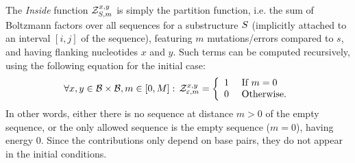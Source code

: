 The \emph{Inside} function $\mathcal{Z}_{S, m}^{x,y}$ is simply the partition function, i.e. the sum of Boltzmann factors over all sequences for a substructure $S$ (implicitly attached to an interval $[i,j]$ of the sequence), featuring $m$ mutations/errors compared to $s$, and having flanking nucleotides $x$ and $y$. 
Such terms can be computed recursively, using the following equation for the initial case:
\begin{equation}
	\forall x,y\in \mathcal{B}\times \mathcal{B}, m\in [0,M]:\, \mathcal{Z}_{\varepsilon, m}^{x,y}=\left\{
	\begin{array}{ll}
		1 &\text{ If } m = 0\\
		0 &\text{ Otherwise.}
	\end{array}\right.
\label{eq:Z_in}
\end{equation}
In other words, either there is no sequence at distance $m>0$ of the empty sequence, or the only allowed sequence is the empty sequence ($m=0$), having energy $0$. Since the contributions only depend on base pairs, they do not appear in the initial conditions. 

